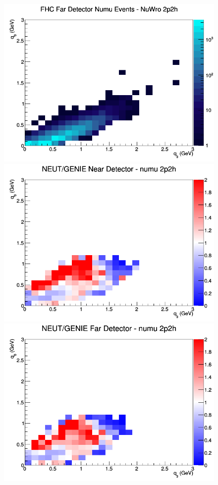 \begin{figure}[h]
\endminipage
{}
\includegraphics[width=\linewidth]{eff_q0_q3/LAr/2p2h_FHC_FD_numu_q3_q0_NuWro.png}
\endminipage
\newline
{}
\includegraphics[width=\linewidth]{eff_q0_q3/LAr/ratios/2p2h_NEUT_GENIE_numu_near_q3_q0.png}
\endminipage
{}
\includegraphics[width=\linewidth]{eff_q0_q3/LAr/ratios/2p2h_NEUT_GENIE_numu_far_q3_q0.png}

\end{figure}
